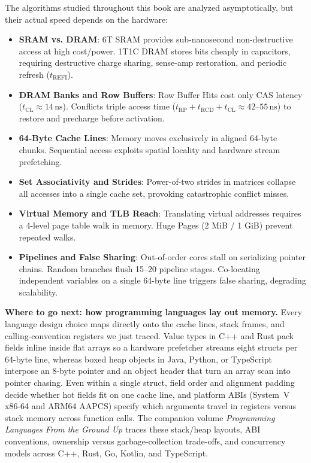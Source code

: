 The algorithms studied throughout this book are analyzed asymptotically, but their actual
speed depends on the hardware:
\begin{itemize}[itemsep=0pt]
    \item \textbf{SRAM vs. DRAM}: 6T SRAM provides sub-nanosecond non-destructive access at high cost/power. 1T1C DRAM stores bits cheaply in capacitors, requiring destructive charge sharing, sense-amp restoration, and periodic refresh ($t_{\text{REFI}}$).
    \item \textbf{DRAM Banks and Row Buffers}: Row Buffer Hits cost only CAS latency ($t_{\text{CL}} \approx 14\,\text{ns}$). Conflicts triple access time ($t_{\text{RP}} + t_{\text{RCD}} + t_{\text{CL}} \approx 42\text{--}55\,\text{ns}$) to restore and precharge before activation.
    \item \textbf{64-Byte Cache Lines}: Memory moves exclusively in aligned 64-byte chunks. Sequential access exploits spatial locality and hardware stream prefetching.
    \item \textbf{Set Associativity and Strides}: Power-of-two strides in matrices collapse all accesses into a single cache set, provoking catastrophic conflict misses.
    \item \textbf{Virtual Memory and TLB Reach}: Translating virtual addresses requires a 4-level page table walk in memory. Huge Pages (2 MiB / 1 GiB) prevent repeated walks.
    \item \textbf{Pipelines and False Sharing}: Out-of-order cores stall on serializing pointer chains. Random branches flush 15--20 pipeline stages. Co-locating independent variables on a single 64-byte line triggers false sharing, degrading scalability.
\end{itemize}

\begin{connectionbox}
\textbf{Where to go next: how programming languages lay out memory.}
Every language design choice maps directly onto the cache lines, stack frames, and
calling-convention registers we just traced. Value types in C++ and Rust pack fields
inline inside flat arrays so a hardware prefetcher streams eight structs per 64-byte
line, whereas boxed heap objects in Java, Python, or TypeScript interpose an 8-byte
pointer and an object header that turn an array scan into pointer chasing. Even within a
single struct, field order and alignment padding decide whether hot fields fit on one
cache line, and platform ABIs (System~V x86-64 and ARM64 AAPCS) specify which arguments
travel in registers versus stack memory across function calls. The companion volume
\emph{Programming Languages From the Ground Up} traces these stack/heap layouts, ABI
conventions, ownership versus garbage-collection trade-offs, and concurrency models
across C++, Rust, Go, Kotlin, and TypeScript.
\end{connectionbox}

